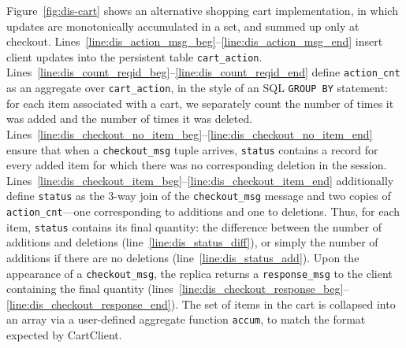 Figure~\ref{fig:dis-cart} shows an alternative shopping cart implementation, in
which updates are monotonically accumulated in a set, and summed up only at
checkout.  Lines~\ref{line:dis_action_msg_beg}--\ref{line:dis_action_msg_end}
insert client updates into the persistent table \texttt{cart\_action}.
Lines~\ref{line:dis_count_reqid_beg}--\ref{line:dis_count_reqid_end} define
\texttt{action\_cnt} as an aggregate over \texttt{cart\_action}, in the style of
an SQL \texttt{GROUP BY} statement: for each item associated with a cart, we
separately count the number of times it was added and the number of times it was
deleted.
Lines~\ref{line:dis_checkout_no_item_beg}--\ref{line:dis_checkout_no_item_end}
ensure that when a \texttt{checkout\_msg} tuple arrives, \texttt{status}
contains a record for every added item for which there was no corresponding
deletion in the session.
Lines~\ref{line:dis_checkout_item_beg}--\ref{line:dis_checkout_item_end}
additionally define \texttt{status} as the 3-way join of the
\texttt{checkout\_msg} message and two copies of \texttt{action\_cnt}---one
corresponding to additions and one to deletions.  Thus, for each item,
\texttt{status} contains its final quantity: the difference between the number
of additions and deletions (line~\ref{line:dis_status_diff}), or simply the
number of additions if there are no deletions (line~\ref{line:dis_status_add}).
Upon the appearance of a \texttt{checkout\_msg}, the replica returns a
\texttt{response\_msg} to the client containing the final quantity
(lines~\ref{line:dis_checkout_response_beg}--\ref{line:dis_checkout_response_end}).
The set of items in the cart is collapsed into an array via a user-defined aggregate
function \texttt{accum}, to match the format expected by CartClient.


